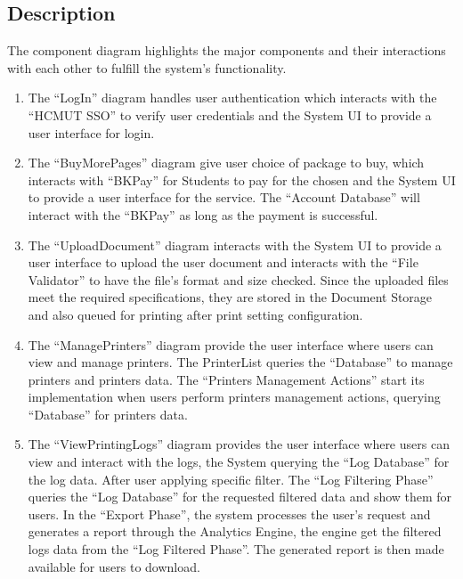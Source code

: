 \subsection{Description}
The component diagram highlights the major components and their interactions with each other to fulfill the system’s functionality.
\begin{enumerate}
    \item  The “LogIn” diagram handles user authentication which interacts with the “HCMUT SSO” to verify user credentials and the System UI to provide a user interface for login.
    \item The “BuyMorePages” diagram give user choice of package to buy, which interacts with “BKPay” for Students to pay for the chosen and the System UI to provide a user interface for the service. The “Account Database” will interact with the “BKPay” as long as the payment is successful.
    \item The “UploadDocument” diagram interacts with the System UI to provide a user interface to upload the user document and interacts with the “File Validator” to have the file’s format and size checked. Since the uploaded files meet the required specifications, they are stored in the Document Storage and also queued for printing after print setting configuration.
    \item The “ManagePrinters” diagram provide the user interface where users can view and manage printers. The PrinterList queries the “Database” to manage printers and printers data. The “Printers Management Actions” start its implementation when users perform printers management actions, querying “Database” for printers data.
    \item The “ViewPrintingLogs” diagram provides the user interface where users can view and interact with the logs, the System querying the “Log Database” for the log data. After user applying specific filter. The “Log Filtering Phase” queries the “Log Database” for the requested filtered data and show them for users. In the “Export Phase”, the system processes the user’s request and generates a report through the Analytics Engine, the engine get the filtered logs data from the “Log Filtered Phase”. The generated report is then made available for users to download.
\end{enumerate}

\newpage